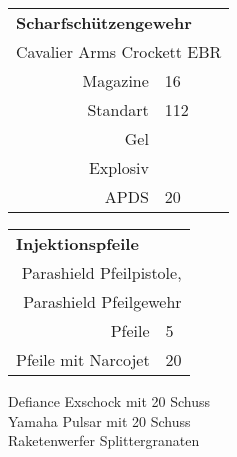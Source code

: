 {\begin{tabular}[]{r | l}
	\multicolumn{2}{l}{\textbf{Scharfschützengewehr}}\\
	\multicolumn{2}{r}{Cavalier Arms Crockett EBR}\\
	\hline
	Magazine & 16 \\
	\hline
	Standart & 112 \\
	Gel &  \\
	Explosiv &  \\
	APDS & 20 \\
	\hline
\end{tabular}
\begin{tabular}[]{r | l}
	\multicolumn{2}{l}{\textbf{Injektionspfeile}}\\
	\multicolumn{2}{r}{Parashield Pfeilpistole,}\\
	\multicolumn{2}{r}{Parashield Pfeilgewehr}\\
	\hline
	Pfeile & 5 \\
	Pfeile mit Narcojet & 20 \\
	\hline
\end{tabular}

Defiance Exschock mit 20 Schuss \\
Yamaha Pulsar mit 20 Schuss \\
Raketenwerfer Splittergranaten

\begin{multicols}{2}


\end{multicols}}
